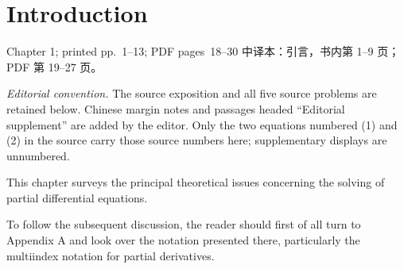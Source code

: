 \chapter{Introduction}
\label{chap:introduction}

\PDESource
  {Chapter 1; printed pp.~1--13; PDF pages~18--30}
  {中译本：引言，书内第 1--9 页；PDF 第 19--27 页。}

\noindent\textit{Editorial convention.}
The source exposition and all five source problems are retained below.
Chinese margin notes and passages headed ``Editorial supplement'' are added
by the editor. Only the two equations numbered (1) and (2) in the source
carry those source numbers here; supplementary displays are unnumbered.

This chapter surveys the principal theoretical issues concerning the solving of
partial differential equations.

To follow the subsequent discussion, the reader should first of all turn to
Appendix A and look over the notation presented there, particularly the
multiindex notation for partial derivatives.







